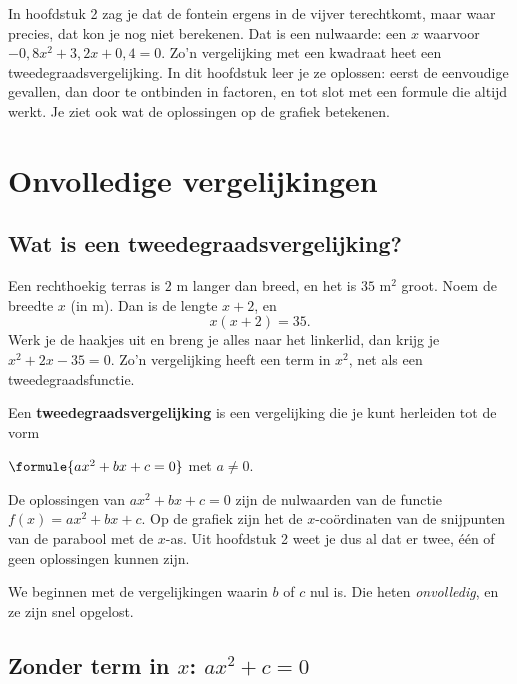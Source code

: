 In hoofdstuk 2 zag je dat de fontein ergens in de vijver terechtkomt, maar waar precies, dat kon je nog niet berekenen. Dat is een nulwaarde: een $x$ waarvoor $-0,8x^2 + 3,2x + 0,4 = 0$. Zo'n vergelijking met een kwadraat heet een tweedegraadsvergelijking. In dit hoofdstuk leer je ze oplossen: eerst de eenvoudige gevallen, dan door te ontbinden in factoren, en tot slot met een formule die altijd werkt. Je ziet ook wat de oplossingen op de grafiek betekenen.

\begin{oefeningen}[Start]

\end{oefeningen}

\section{Onvolledige vergelijkingen}

\subsection{Wat is een tweedegraadsvergelijking?}

Een rechthoekig terras is $2$ m langer dan breed, en het is $35$ m$^2$ groot. Noem de breedte $x$ (in m). Dan is de lengte $x + 2$, en
\[x(x + 2) = 35.\]
Werk je de haakjes uit en breng je alles naar het linkerlid, dan krijg je $x^2 + 2x - 35 = 0$. Zo'n vergelijking heeft een term in $x^2$, net als een tweedegraadsfunctie.

\begin{theorie}
Een \textbf{\textcolor{accent}{tweedegraadsvergelijking}} is een vergelijking die je kunt herleiden tot de vorm

\qquad $\formule{ax^2 + bx + c = 0}$ \qquad met $a \neq 0$.
\end{theorie}

De oplossingen van $ax^2 + bx + c = 0$ zijn de nulwaarden van de functie $f(x) = ax^2 + bx + c$. Op de grafiek zijn het de $x$-coördinaten van de snijpunten van de parabool met de $x$-as. Uit hoofdstuk 2 weet je dus al dat er twee, één of geen oplossingen kunnen zijn.

We beginnen met de vergelijkingen waarin $b$ of $c$ nul is. Die heten \textit{onvolledig}, en ze zijn snel opgelost.

\subsection{Zonder term in \texorpdfstring{$x$}{x}: \texorpdfstring{$ax^2 + c = 0$}{ax² + c = 0}}


